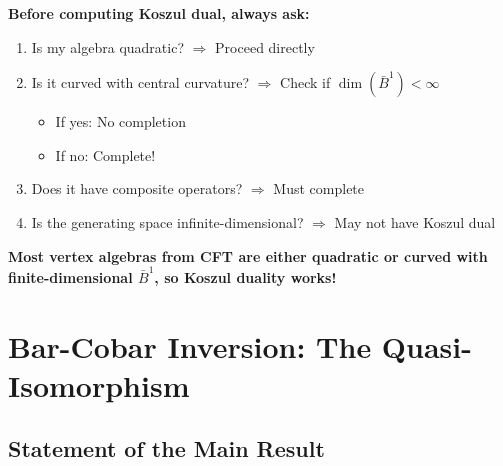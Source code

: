 \begin{remark}\label{rem:practitioner-takeaway}
\textbf{Before computing Koszul dual, always ask:}
\begin{enumerate}
\item Is my algebra quadratic? $\Rightarrow$ Proceed directly
\item Is it curved with central curvature? $\Rightarrow$ Check if $\dim(\bar{B}^1) < \infty$
  \begin{itemize}
  \item If yes: No completion
  \item If no: Complete!
  \end{itemize}
\item Does it have composite operators? $\Rightarrow$ Must complete
\item Is the generating space infinite-dimensional? $\Rightarrow$ May not have Koszul dual
\end{enumerate}

\textbf{Most vertex algebras from CFT are either quadratic or curved with finite-dimensional 
$\bar{B}^1$, so Koszul duality works!}
\end{remark}



\section{Bar-Cobar Inversion: The Quasi-Isomorphism}
\label{sec:bar-cobar-inversion-quasi-iso}

\subsection{Statement of the Main Result}

